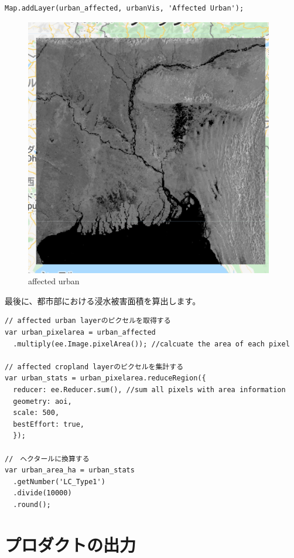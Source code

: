 \documentclass[
]{book}
\begin{document}
\begin{verbatim}
Map.addLayer(urban_affected, urbanVis, 'Affected Urban');
\end{verbatim}

\begin{figure}
\centering
\includegraphics{images/affected urban.png}
\caption{affected urban}
\end{figure}

最後に、都市部における浸水被害面積を算出します。

\begin{verbatim}
// affected urban layerのピクセルを取得する
var urban_pixelarea = urban_affected
  .multiply(ee.Image.pixelArea()); //calcuate the area of each pixel 

// affected cropland layerのピクセルを集計する
var urban_stats = urban_pixelarea.reduceRegion({
  reducer: ee.Reducer.sum(), //sum all pixels with area information                
  geometry: aoi,
  scale: 500,
  bestEffort: true,
  });

//　ヘクタールに換算する
var urban_area_ha = urban_stats
  .getNumber('LC_Type1')
  .divide(10000)
  .round();
\end{verbatim}

\hypertarget{ux30d7ux30edux30c0ux30afux30c8ux306eux51faux529b}{%
\chapter{プロダクトの出力}\label{ux30d7ux30edux30c0ux30afux30c8ux306eux51faux529b}}
\end{document}
